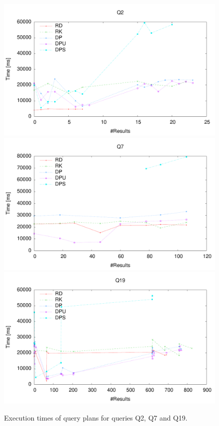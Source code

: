 \begin{figure}[htb]
  \centering
  \includegraphics[width=0.8\linewidth]{figs/pareto_exec_0_q2.pdf}
  \includegraphics[width=0.8\linewidth]{figs/pareto_exec_0_q7.pdf}
  \includegraphics[width=0.8\linewidth]{figs/pareto_exec_0_q19.pdf}
  \caption{Execution times of query plans for queries Q2, Q7 and Q19.}
  \label{fig:exec}
\end{figure}
